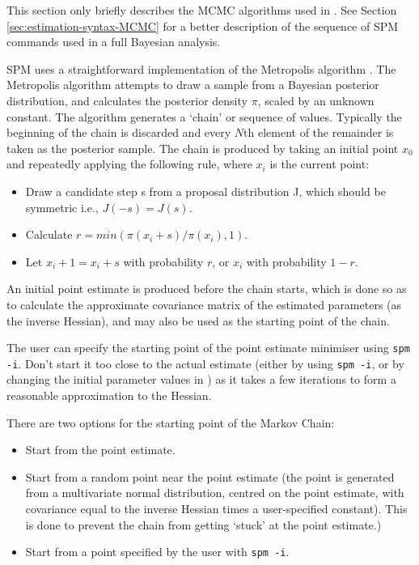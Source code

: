 This section only briefly describes the MCMC algorithms used in \SPM. See Section \ref{sec:estimation-syntax-MCMC} for a better description of the sequence of SPM commands used in a full Bayesian analysis.

SPM uses a straightforward implementation of the Metropolis algorithm \citep{823,143}. The Metropolis algorithm attempts to draw a sample from a Bayesian posterior distribution, and calculates the posterior density $\pi$, scaled by an unknown constant. The algorithm generates a `chain' or sequence of values. Typically the beginning of the chain is discarded and every $N$th element of the remainder is taken as the posterior sample. The chain is produced by taking an initial point $x_0$ and repeatedly applying the following rule, where $x_i$ is the current point: 

\begin{itemize}
\item Draw a candidate step s from a proposal distribution J, which should be symmetric i.e., $J(-s)=J(s)$.

\item Calculate $r=min(\pi(x_i+s)/\pi(x_i),1)$. 

\item Let $x_i+1=x_i+s$ with probability $r$, or $x_i$ with probability $1-r$.
\end{itemize}

An initial point estimate is produced before the chain starts, which is done so as to calculate the approximate covariance matrix of the estimated parameters (as the inverse Hessian), and may also be used as the starting point of the chain. 

The user can specify the starting point of the point estimate minimiser using \texttt{spm -i}. Don't start it too close to the actual estimate (either by using \texttt{spm -i}, or by changing the initial parameter values in \config) as it takes a few iterations to form a reasonable approximation to the Hessian. 

There are two options for the starting point of the Markov Chain: 

\begin{itemize}
\item Start from the point estimate.

\item Start from a random point near the point estimate (the point is generated from a multivariate normal distribution, centred on the point estimate, with covariance equal to the inverse Hessian times a user-specified constant). This is done to prevent the chain from getting `stuck' at the point estimate.)

\item Start from a point specified by the user with \texttt{spm -i}.
\end{itemize}

